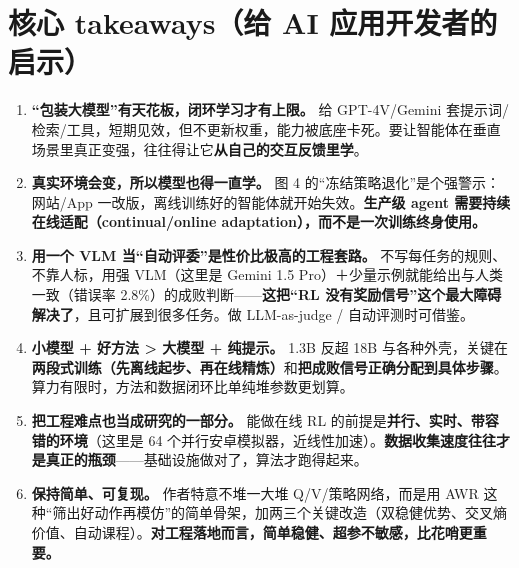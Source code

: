 \documentclass[11pt,UTF8,fontset=fandol]{ctexart}
\begin{document}
\section{核心 takeaways（给 AI 应用开发者的启示）}
\begin{enumerate}[leftmargin=1.6em]
\item \textbf{“包装大模型”有天花板，闭环学习才有上限。} 给 GPT-4V/Gemini 套提示词/检索/工具，短期见效，但不更新权重，能力被底座卡死。要让智能体在垂直场景里真正变强，往往得让它\textbf{从自己的交互反馈里学}。
\item \textbf{真实环境会变，所以模型也得一直学。} 图 4 的“冻结策略退化”是个强警示：网站/App 一改版，离线训练好的智能体就开始失效。\textbf{生产级 agent 需要持续在线适配（continual/online adaptation），而不是一次训练终身使用。}
\item \textbf{用一个 VLM 当“自动评委”是性价比极高的工程套路。} 不写每任务的规则、不靠人标，用强 VLM（这里是 Gemini 1.5 Pro）＋少量示例就能给出与人类一致（错误率 2.8\%）的成败判断——\textbf{这把“RL 没有奖励信号”这个最大障碍解决了}，且可扩展到很多任务。做 LLM-as-judge / 自动评测时可借鉴。
\item \textbf{小模型 + 好方法 > 大模型 + 纯提示。} 1.3B 反超 18B 与各种外壳，关键在\textbf{两段式训练（先离线起步、再在线精炼）}和\textbf{把成败信号正确分配到具体步骤}。算力有限时，方法和数据闭环比单纯堆参数更划算。
\item \textbf{把工程难点也当成研究的一部分。} 能做在线 RL 的前提是\textbf{并行、实时、带容错的环境}（这里是 64 个并行安卓模拟器，近线性加速）。\textbf{数据收集速度往往才是真正的瓶颈}——基础设施做对了，算法才跑得起来。
\item \textbf{保持简单、可复现。} 作者特意不堆一大堆 Q/V/策略网络，而是用 AWR 这种“筛出好动作再模仿”的简单骨架，加两三个关键改造（双稳健优势、交叉熵价值、自动课程）。\textbf{对工程落地而言，简单稳健、超参不敏感，比花哨更重要。}
\end{enumerate}
\end{document}
